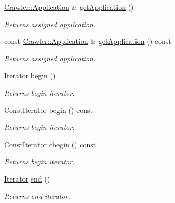 \begin{DoxyCompactItemize}
\hyperlink{class_crawler_1_1_application}{Crawler\+::\+Application} \& \hyperlink{class_crawler_1_1_website_manager_aa5bfdf43dbee41e408aae5df57159824}{get\+Application} ()
\begin{DoxyCompactList}\small\item\em Returns assigned application. \end{DoxyCompactList}\item 
const \hyperlink{class_crawler_1_1_application}{Crawler\+::\+Application} \& \hyperlink{class_crawler_1_1_website_manager_a9845375139da6d2e002daf2a14a0ae26}{get\+Application} () const 
\begin{DoxyCompactList}\small\item\em Returns assigned application. \end{DoxyCompactList}\item 
\hyperlink{class_crawler_1_1_website_manager_a73a0d579dfd90c0f5eab55c0f0ae82a8}{Iterator} \hyperlink{class_crawler_1_1_website_manager_a0da0227729636655190bb8679f5cbd39}{begin} ()
\begin{DoxyCompactList}\small\item\em Returns begin iterator. \end{DoxyCompactList}\item 
\hyperlink{class_crawler_1_1_website_manager_a5540e8864e8c8defbf06ebfc3aa6c7c8}{Const\+Iterator} \hyperlink{class_crawler_1_1_website_manager_a02f632879597f127a978ffbb6dc532a3}{begin} () const 
\begin{DoxyCompactList}\small\item\em Returns begin iterator. \end{DoxyCompactList}\item 
\hyperlink{class_crawler_1_1_website_manager_a5540e8864e8c8defbf06ebfc3aa6c7c8}{Const\+Iterator} \hyperlink{class_crawler_1_1_website_manager_a574b34605ba1629e890e577a22c167f0}{cbegin} () const 
\begin{DoxyCompactList}\small\item\em Returns begin iterator. \end{DoxyCompactList}\item 
\hyperlink{class_crawler_1_1_website_manager_a73a0d579dfd90c0f5eab55c0f0ae82a8}{Iterator} \hyperlink{class_crawler_1_1_website_manager_ad96ddfa5b856df683c2742bb63662c0c}{end} ()
\begin{DoxyCompactList}\small\item\em Returns end iterator. \end{DoxyCompactList}\item 

\end{DoxyCompactItemize}
